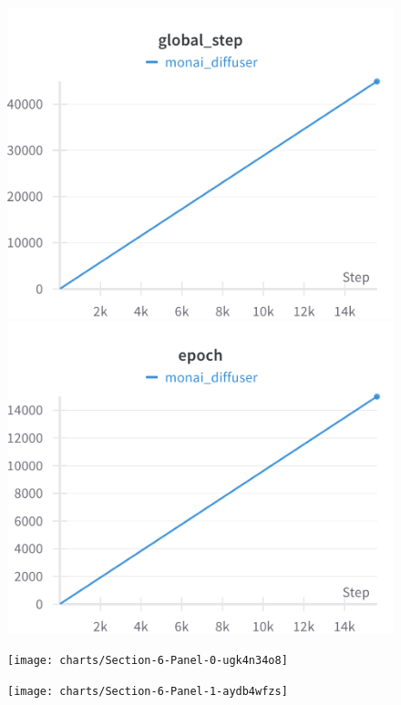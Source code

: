 \documentclass{article}
\begin{document}
\begin{figure}[!htb]
\includegraphics[width=\linewidth]{charts/Section-4-Panel-4-z2xepgyu7}
\caption{}
\endminipage\hfill
{}
\includegraphics[width=\linewidth]{charts/Section-4-Panel-5-4t8ldmpb8}
\caption{}
\endminipage
\end{figure}

\begin{figure}[!htb]
\texttt{[image: charts/Section-6-Panel-0-ugk4n34o8]}
\caption{}
\endminipage\hfill
{}
\texttt{[image: charts/Section-6-Panel-1-aydb4wfzs]}
\caption{}
\endminipage
\end{figure}
\end{document}
